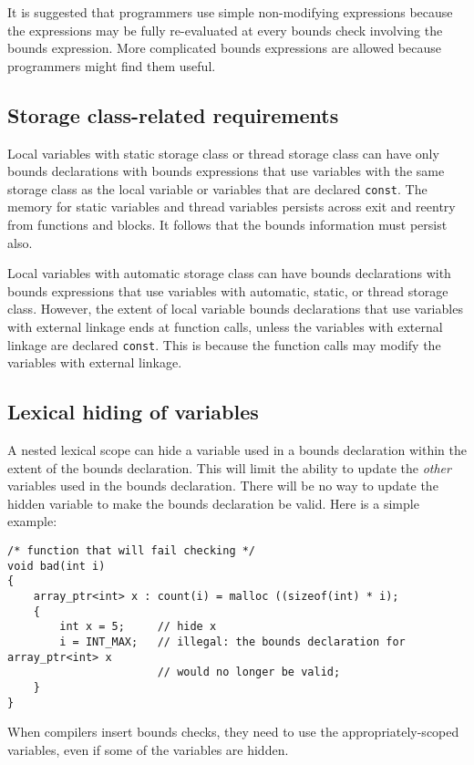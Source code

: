 It is suggested that programmers use simple non-modifying expressions because
the expressions may be fully re-evaluated at every bounds check involving the
bounds expression. More complicated bounds expressions are allowed
because programmers might find them useful.

\subsection{Storage class-related requirements}

Local variables with static storage class or thread storage class can
have only bounds declarations with bounds expressions that use variables
with the same storage class as the local variable or variables that are declared
\texttt{const}. The memory for static variables and thread variables
persists across exit and reentry from functions and blocks. It follows
that the bounds information must persist also.

Local variables with automatic storage class can have bounds
declarations with bounds expressions that use variables with automatic,
static, or thread storage class. However, the extent of local variable
bounds declarations that use variables with external linkage ends at
function calls, unless the variables with external linkage are declared
\texttt{const}. This is because the function calls may modify the
variables with external linkage.

\subsection{Lexical hiding of variables}

A nested lexical scope can hide a variable used in a bounds declaration
within the extent of the bounds declaration. This will limit the ability
to update the {\it other} variables used in the bounds declaration.  There will be
no way to update the hidden variable to make the bounds declaration be valid.
Here is a simple example:
\begin{verbatim}
/* function that will fail checking */
void bad(int i)
{
    array_ptr<int> x : count(i) = malloc ((sizeof(int) * i);
    {
        int x = 5;     // hide x
        i = INT_MAX;   // illegal: the bounds declaration for array_ptr<int> x
                       // would no longer be valid;
    }
}
\end{verbatim}
When compilers insert bounds checks, they need to use the appropriately-scoped
variables, even if some of the variables are hidden.

